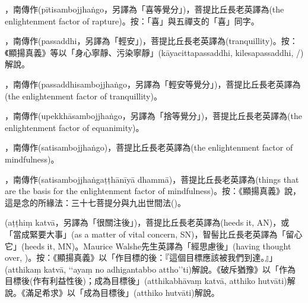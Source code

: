 \startitemgroup[noteitems]
\item{}，南傳作(pītisambojjhaṅgo，另譯為「喜等覺分」)，菩提比丘長老英譯為(the enlightenment factor of rapture)。按：「喜」與五禪支的「喜」同字。
\stopitemgroup

\startitemgroup[noteitems]
\item{}，南傳作(passaddhi，另譯為「輕安」)，菩提比丘長老英譯為(tranquillity)。按：《顯揚真義》等以「身心寧靜、污染寧靜」(kāyacittapassaddhi, kilesapassaddhi, /)解說。
\item{}，南傳作(passaddhisambojjhaṅgo，另譯為「輕安等覺分」)，菩提比丘長老英譯為(the enlightenment factor of tranquillity)。
\stopitemgroup

\startitemgroup[noteitems]
\item{}，南傳作(upekkhāsambojjhaṅgo，另譯為「捨等覺分」)，菩提比丘長老英譯為(the enlightenment factor of equanimity)。
\stopitemgroup

\startitemgroup[noteitems]
\item{}，南傳作(satisambojjhaṅgo)，菩提比丘長老英譯為(the enlightenment factor of mindfulness)。
\item{}，南傳作(satisambojjhaṅgaṭṭhānīyā dhammā)，菩提比丘長老英譯為(things that are the basis for the enlightenment factor of mindfulness)。按：《顯揚真義》說，這是念的所緣法：三十七菩提分與九出世間法()。 
\stopitemgroup

\startitemgroup[noteitems]
\item{}(aṭṭhiṃ katvā，另譯為「很關注後」)，菩提比丘長老英譯為(heeds it, AN)，或「當成緊要大事」(as a matter of vital concern, SN)，智髻比丘長老英譯為「留心它」(heeds it, MN)。Maurice Walshe先生英譯為「經思慮後」(having thought over, )。按：《顯揚真義》以「作目標的後：『這個目標應該被我們到達。』」(atthikaṃ katvā, ‘‘ayaṃ no adhigantabbo attho’’ti)解說。《破斥猶豫》以「作為目標後(作有利益性後)；成為目標後」(atthikabhāvaṃ katvā, atthiko hutvāti)解說。《滿足希求》以「成為目標後」(atthiko hutvāti)解說。
\stopitemgroup

